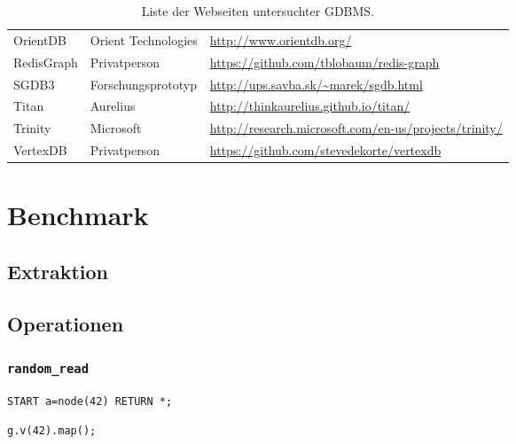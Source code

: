 \begin{table}[h]
\begin{footnotesize}
\begin{tabular}{|m{2.5cm}|m{3.5cm}|>{\arraybackslash}m{9.25cm}|}
   	OrientDB 		& Orient Technologies 	& \url{http://www.orientdb.org/} \\
   	RedisGraph 		& Privatperson 			& \url{https://github.com/tblobaum/redis-graph} \\
   	SGDB3 			& Forschungsprototyp 	& \url{http://ups.savba.sk/~marek/sgdb.html} \\
   	Titan 			& Aurelius 				& \url{http://thinkaurelius.github.io/titan/} \\
   	Trinity 		& Microsoft 			& \url{http://research.microsoft.com/en-us/projects/trinity/} \\
   	VertexDB 		& Privatperson 			& \url{https://github.com/stevedekorte/vertexdb} \\
   	\hline
   	\end{tabular} 
	\end{footnotesize}
	\setlength{\belowcaptionskip}{0.25cm}	
	\caption[GDBMS-Hersteller]{Liste der Webseiten untersuchter GDBMS.}
	\label{tab:anh_urls}
\end{table}
\renewcommand{\arraystretch}{1}

\section{Benchmark}

\subsection{Extraktion}
\label{anh:extraction}

\subsection{Operationen}
\label{anh:queries}

\subsubsection*{\texttt{random\_read}}

\begin{lstlisting}
START a=node(42) RETURN *;
\end{lstlisting}

\begin{lstlisting}
g.v(42).map();
\end{lstlisting}

